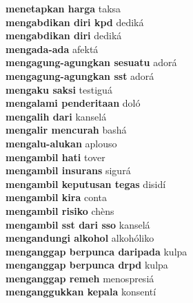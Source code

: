 \textbf{ menetapkan harga  } taksa \\
\textbf{ mengabdikan diri kpd  } dediká \\
\textbf{ mengabdikan diri  } dediká \\
\textbf{ mengada-ada  } afektá \\
\textbf{ mengagung-agungkan sesuatu  } adorá \\
\textbf{ mengagung-agungkan sst  } adorá \\
\textbf{ mengaku saksi  } testiguá \\
\textbf{ mengalami penderitaan  } doló \\
\textbf{ mengalih dari  } kanselá \\
\textbf{ mengalir mencurah  } bashá \\
\textbf{ mengalu-alukan  } aplouso \\
\textbf{ mengambil hati  } tover \\
\textbf{ mengambil insurans  } sigurá \\
\textbf{ mengambil keputusan tegas  } disidí \\
\textbf{ mengambil kira  } conta \\
\textbf{ mengambil risiko  } chèns \\
\textbf{ mengambil sst dari sso  } kanselá \\
\textbf{ mengandungi alkohol  } alkohóliko \\
\textbf{ menganggap berpunca daripada  } kulpa \\
\textbf{ menganggap berpunca drpd  } kulpa \\
\textbf{ menganggap remeh  } menospresiá \\
\textbf{ menganggukkan kepala  } konsentí \\
